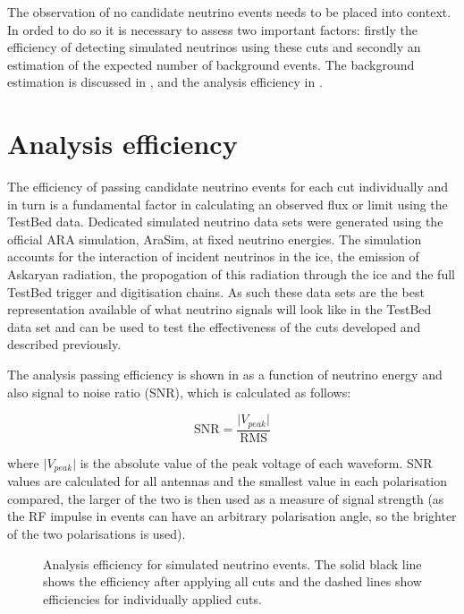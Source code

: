 The observation of no candidate neutrino events needs to be placed into context. In orded to do so it is necessary to assess two important factors: firstly the efficiency of detecting simulated neutrinos using these cuts and secondly an estimation of the expected number of background events. The background estimation is discussed in , and the analysis efficiency in .


\section{Analysis efficiency}
\label{sec:Analysis:Efficiency}

The efficiency of passing candidate neutrino events for each cut individually and in turn is a fundamental factor in calculating an observed flux or limit using the TestBed data. Dedicated simulated neutrino data sets were generated using the official ARA simulation, AraSim, at fixed neutrino energies. The simulation accounts for the interaction of incident neutrinos in the ice, the emission of Askaryan radiation, the propogation of this radiation through the ice and the full TestBed trigger and digitisation chains. As such these data sets are the best representation available of what neutrino signals will look like in the TestBed data set and can be used to test the effectiveness of the cuts developed and described previously.

The analysis passing efficiency is shown in  as a function of neutrino energy and also signal to noise ratio (SNR), which is calculated as follows:

\begin{equation}
  \mbox{SNR} = \frac{\lvert V_{peak} \rvert}{\mbox{RMS}}
\end{equation}

\noindent where $\lvert V_{peak} \rvert$ is the absolute value of the peak voltage of each waveform. SNR values are calculated for all antennas and the smallest value in each polarisation compared, the larger of the two is then used as a measure of signal strength (as the RF impulse in events can have an arbitrary polarisation angle, so the brighter of the two polarisations is used).

\begin{figure}[htpb]
\hfill
{}
\caption{Analysis efficiency for simulated neutrino events. The solid black line shows the efficiency after applying all cuts and the dashed lines show efficiencies for individually applied cuts.}
\label{fig:Analysis:Cut-Results:Efficiency}
\end{figure}



